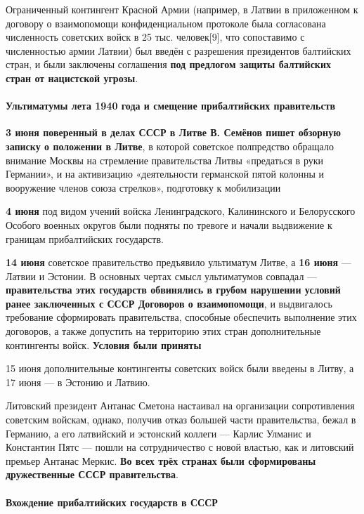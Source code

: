 \documentclass{article}
\begin{document}
Ограниченный контингент Красной Армии (например, в Латвии в приложенном к договору о взаимопомощи конфиденциальном протоколе была согласована численность советских войск в 25 тыс. человек[9], что сопоставимо с численностью армии Латвии) был введён с разрешения президентов балтийских стран, и были заключены соглашения \textbf{под предлогом защиты балтийских стран от нацистской угрозы}.

\paragraph{Ультиматумы лета 1940 года и смещение прибалтийских правительств}

\textbf{3 июня поверенный в делах СССР в Литве В. Семёнов пишет обзорную записку о положении в Литве}, в которой советское полпредство обращало внимание Москвы на стремление правительства Литвы «предаться в руки Германии», и на активизацию «деятельности германской пятой колонны и вооружение членов союза стрелков», подготовку к мобилизации

\hfill

\textbf{4 июня} под видом учений войска Ленинградского, Калининского и Белорусского Особого военных округов были подняты по тревоге и начали выдвижение к границам прибалтийских государств. 

\textbf{14 июня} советское правительство предъявило ультиматум Литве, а \textbf{16 июня} — Латвии и Эстонии. В основных чертах смысл ультиматумов совпадал — \textbf{правительства этих государств обвинялись в грубом нарушении условий ранее заключенных с СССР Договоров о взаимопомощи}, и выдвигалось требование сформировать правительства, способные обеспечить выполнение этих договоров, а также допустить на территорию этих стран дополнительные контингенты войск. \textbf{Условия были приняты}

\hfill

15 июня дополнительные контингенты советских войск были введены в Литву, а 17 июня — в Эстонию и Латвию.

\hfill

Литовский президент Антанас Сметона настаивал на организации сопротивления советским войскам, однако, получив отказ большей части правительства, бежал в Германию, а его латвийский и эстонский коллеги — Карлис Улманис и Константин Пятс — пошли на сотрудничество с новой властью, как и литовский премьер Антанас Меркис. \textbf{Во всех трёх странах были сформированы дружественные СССР правительства}.

\paragraph{Вхождение прибалтийских государств в СССР}
\end{document}
